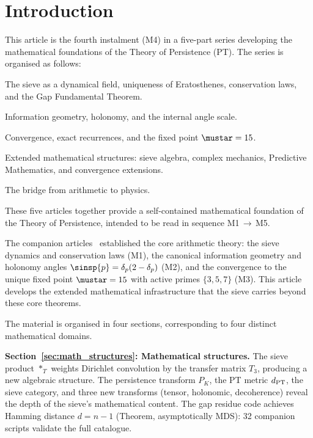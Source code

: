 \documentclass[12pt,a4paper]{article}
\begin{document}
\tableofcontents
\newpage

\section{Introduction}
\label{sec:intro}

This article is the fourth instalment (M4) in a five-part series
developing the mathematical foundations of the Theory of Persistence
(PT).  The series is organised as follows:
\begin{description}[nosep]
\item[M1~\cite{companion_M1}:] The sieve as a dynamical field,
  uniqueness of Eratosthenes, conservation laws, and the Gap
  Fundamental Theorem.
\item[M2~\cite{companion_M2}:] Information geometry, holonomy, and the
  internal angle scale.
\item[M3~\cite{companion_M3}:] Convergence, exact recurrences, and
  the fixed point $\mustar = 15$.
\item[M4 (this article):] Extended mathematical structures: sieve
  algebra, complex mechanics, Predictive Mathematics, and convergence
  extensions.
\item[M5~\cite{companion_M5}:] The bridge from arithmetic to physics.
\end{description}

\noindent
These five articles together provide a self-contained mathematical
foundation of the Theory of Persistence, intended to be read in
sequence M1\,$\to$\,M5.

The companion articles~\cite{companion_M1,companion_M2,companion_M3}
established the core arithmetic theory: the sieve dynamics and
conservation laws (M1), the canonical information geometry and holonomy
angles $\sinsp{p} = \delta_p(2 - \delta_p)$ (M2), and the convergence
to the unique fixed point $\mustar = 15$ with active primes
$\{3, 5, 7\}$ (M3).  This article develops the extended mathematical
infrastructure that the sieve carries beyond these core theorems.

The material is organised in four sections, corresponding to four
distinct mathematical domains.

\textbf{Section~\ref{sec:math_structures}: Mathematical structures.}
The sieve product $*_T$ weights Dirichlet convolution by the transfer
matrix $T_3$, producing a new algebraic structure.  The persistence
transform $P_K$, the PT metric $d_{\rm PT}$, the sieve category, and
three new transforms (tensor, holonomic, decoherence) reveal the depth
of the sieve's mathematical content.  The gap residue code achieves
Hamming distance $d = n - 1$ (Theorem, asymptotically MDS): 32
companion scripts validate the full catalogue.
\end{document}
